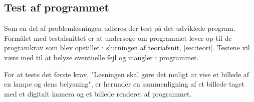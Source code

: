\subsection{Test af programmet}
\label{sec:test}

Som en del af problemløsningen udføres der test på det udviklede program. Formålet med testafsnittet er at undersøge om programmet lever op til de programkrav som blev opstillet i slutningen af teoriafsnit, \ref{sec:teori}. Testene vil være med til at belyse eventuelle fejl og mangler i programmet.

For at teste det første krav, "Løsningen skal gøre det muligt at vise et billede af en lampe og dens belysning", er herunder en sammenligning af et billede taget med et digitalt kamera og et billede renderet af programmet.